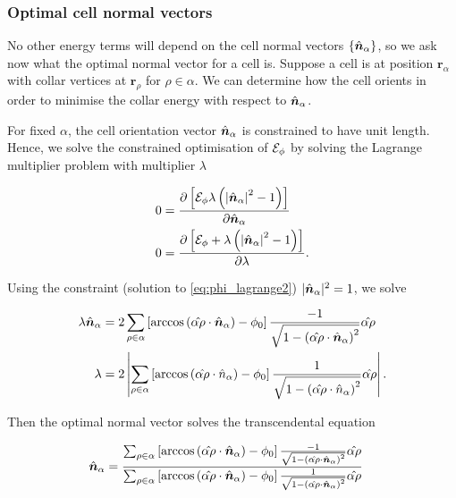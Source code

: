 \subsubsection{Optimal cell normal vectors}

No other energy terms will depend on the cell normal vectors $\{ \hat{\bm{n}}_\alpha \}$, so we ask now what the optimal normal vector for a cell is. Suppose a cell is at position $\bm{r}_\alpha$ with collar vertices at $\bm{r}_\rho$ for $\rho \in \alpha$. We can determine how the cell orients in order to minimise the collar energy with respect to $\hat{\bm{n}}_\alpha$. 

For fixed $\alpha$, the cell orientation vector $\hat{\bm{n}}_\alpha$ is constrained to have unit length. Hence, we solve the constrained optimisation of $\mathcal{E}_\phi$ by solving the Lagrange multiplier problem with multiplier $\lambda$

\begin{align}
    0 &= \frac{\partial \left[ \mathcal{E}_\phi \lambda\left( \left| \hat{\bm{n}}_\alpha\right|^2 - 1\right) \right] }{\partial \hat{\bm{n}}_\alpha} \label{eq:phi_lagrange1} \\
    0 &= \frac{\partial \left[ \mathcal{E}_\phi + \lambda\left( \left| \hat{\bm{n}}_\alpha\right|^2 - 1\right)\right] }{\partial \lambda}. \label{eq:phi_lagrange2}
\end{align}

Using the constraint (solution to \cref{eq:phi_lagrange2}) $| \hat{\bm{n}}_\alpha |^2 = 1$, we solve 

\begin{align*} 
    \lambda \hat{\bm{n}}_\alpha &= 2 \sum_{\rho\in\alpha} \left[ \arccos\left(\hat{\alpha\rho} \cdot \hat{\bm{n}}_\alpha \right) - \phi_0 \right] \frac{-1}{\sqrt{1 - \left(\hat{\alpha\rho} \cdot \hat{\bm{n}}_\alpha \right)^2 }} \hat{\alpha\rho} \\
    \lambda &= 2 \left| \sum_{\rho\in\alpha} \left[ \arccos\left(\hat{\alpha\rho} \cdot \hat{n}_\alpha \right) - \phi_0 \right] \frac{1}{\sqrt{1 - \left(\hat{\alpha\rho} \cdot \hat{n}_\alpha \right)^2 }} \hat{\alpha\rho} \right|.  
\end{align*}

\noindent Then the optimal normal vector solves the transcendental equation 

\begin{align}
    \hat{\bm{n}}_\alpha &= \frac{\sum_{\rho\in\alpha} \left[ \arccos\left(\hat{\alpha\rho} \cdot \hat{\bm{n}}_\alpha \right) - \phi_0 \right] \frac{-1}{\sqrt{1 - \left(\hat{\alpha\rho} \cdot \hat{\bm{n}}_\alpha \right)^2 }} \hat{\alpha\rho} }{\sum_{\rho\in\alpha} \left[ \arccos\left(\hat{\alpha\rho} \cdot \hat{\bm{n}}_\alpha \right) - \phi_0 \right] \frac{1}{\sqrt{1 - \left(\hat{\alpha\rho} \cdot \hat{\bm{n}}_\alpha \right)^2 }} \hat{\alpha\rho}} \label{eq:optimal_n}
\end{align}

